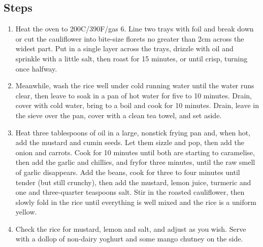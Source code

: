 \documentclass{book}
\begin{document}
\subsection*{Steps}
\begin{enumerate}
\item Heat the oven to 200C/390F/gas 6. Line two trays with foil and break down or cut the cauliflower into bite-size florets no greater than 2cm across the widest part. Put in a single layer across the trays, drizzle with oil and sprinkle with a little salt, then roast for 15 minutes, or until crisp, turning once halfway.
\item Meanwhile, wash the rice well under cold running water until the water runs clear, then leave to soak in a pan of hot water for five to 10 minutes. Drain, cover with cold water, bring to a boil and cook for 10 minutes. Drain, leave in the sieve over the pan, cover with a clean tea towel, and set aside.
\item Heat three tablespoons of oil in a large, nonstick frying pan and, when hot, add the mustard and cumin seeds. Let them sizzle and pop, then add the onion and carrots. Cook for 10 minutes until both are starting to caramelise, then add the garlic and chillies, and fryfor three minutes, until the raw smell of garlic disappears. Add the beans, cook for three to four minutes until tender (but still crunchy), then add the mustard, lemon juice, turmeric and one and three-quarter teaspoons salt. Stir in the roasted cauliflower, then slowly fold in the rice until everything is well mixed and the rice is a uniform yellow.
\item Check the rice for mustard, lemon and salt, and adjust as you wish. Serve with a dollop of non-dairy yoghurt and some mango chutney on the side.
\end{enumerate}
\newpage
\end{document}
